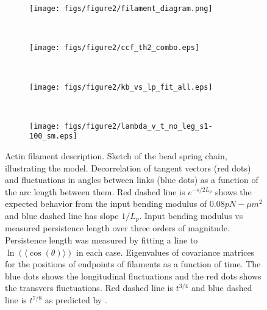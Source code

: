 \documentclass[12pt]{article}
\begin{document}
\begin{figure}[H] 
  \centering
  \begin{subfigure}{0.3\textwidth}
    \centering
    \texttt{[image: figs/figure2/filament\_diagram.png]}
    \caption{\label{fig:sketch}}
  \end{subfigure}
  ~
  \begin{subfigure}{0.4\textwidth}
    \centering
    \texttt{[image: figs/figure2/ccf\_th2\_combo.eps]}
    \caption{\label{fig:avgTh}}
  \end{subfigure}
  ~
  \begin{subfigure}{0.4\textwidth}
    \centering
    \texttt{[image: figs/figure2/kb\_vs\_lp\_fit\_all.eps]}
    \caption{\label{fig:kb}}
  \end{subfigure}
  ~
  \begin{subfigure}{0.4\textwidth}
    \centering
    \texttt{[image: figs/figure2/lambda\_v\_t\_no\_leg\_s1-100\_sm.eps]}
    \caption{\label{fig:fluc}}
  \end{subfigure}
  \caption{\label{fig:filament}
  Actin filament description. 
  Sketch of the bead spring chain, illustrating the model.
   Decorrelation of tangent vectors (red dots) and fluctuations in angles between links (blue dots) 
  as a function of the arc length between them. Red dashed
  line is $e^{-s/2L_p}$ shows the expected behavior from the input bending modulus of $0.08 pN-\mu m^2$ and blue
  dashed line has slope $1/L_p$.
   Input bending modulus vs measured persistence length over three orders of magnitude. Persistence
  length was measured by fitting a line to $\ln{(\langle \cos{(\theta)}\rangle)}$ in each case.
   Eigenvalues of covariance matrices for the positions of endpoints of filaments as a function of time. The blue
  dots shows the longitudinal fluctuations and the red dots shows the transvers fluctuations. Red dashed line is
  $t^{3/4}$ and blue dashed line is $t^{7/8}$ as predicted by \cite{everaers1999}. 
}
\end{figure} 
\end{document}
